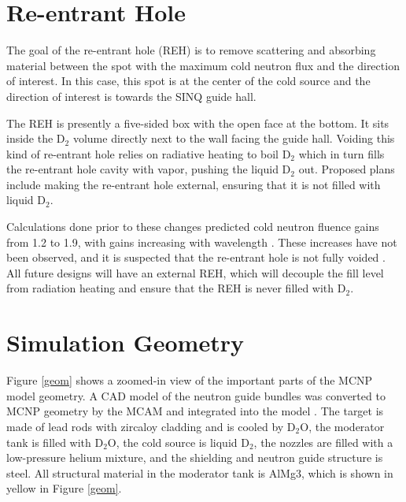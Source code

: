 \documentclass[a4paper]{jpconf}
\begin{document}
\section{Re-entrant Hole}

The goal of the re-entrant hole (REH) is to remove scattering and absorbing material between the spot with the maximum cold neutron flux and the direction of interest.  In this case, this spot is at the center of the cold source and the direction of interest is towards the SINQ guide hall.  

The REH is presently a five-sided box with the open face at the bottom.  It sits inside the D$_2$ volume directly next to the wall facing the guide hall.  Voiding this kind of re-entrant hole relies on radiative heating to boil D$_2$ which in turn fills the re-entrant hole cavity with vapor, pushing the liquid D$_2$ out.  Proposed plans include making the re-entrant hole external, ensuring that it is not filled with liquid D$_2$.

Calculations done prior to these changes predicted cold neutron fluence gains from 1.2 to 1.9, with gains increasing with wavelength \cite{atch_icans}. These increases have not been observed, and it is suspected that the re-entrant hole is not fully voided \cite{voided}.  All future designs will have an external REH, which will decouple the fill level from radiation heating and ensure that the REH is never filled with D$_2$.

\section{Simulation Geometry}

Figure \ref{geom} shows a zoomed-in view of the important parts of the MCNP model geometry.  A CAD model of the neutron guide bundles was converted to MCNP geometry by the MCAM and integrated into the model \cite{mcam}.  The target is made of lead rods with zircaloy cladding and is cooled by D$_2$O, the moderator tank is filled with D$_2$O, the cold source is liquid D$_2$, the nozzles are filled with a low-pressure helium mixture, and the shielding and neutron guide structure is steel.  All structural material in the moderator tank is AlMg3, which is shown in yellow in Figure \ref{geom}.
\end{document}
